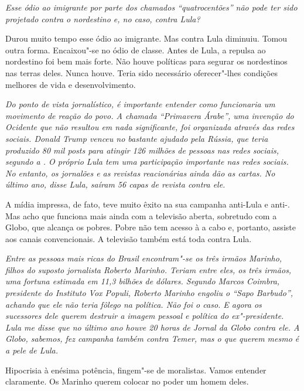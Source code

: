 \itshape
 Esse ódio ao imigrante por parte dos chamados
``quatrocentões'' não pode ter sido projetado contra o nordestino e, no
caso, contra Lula?

\normalfont
Durou muito tempo esse ódio ao imigrante. Mas contra Lula
diminuiu. Tomou outra forma. Encaixou"-se no ódio de classe. Antes de
Lula, a repulsa ao nordestino foi bem mais forte. Não houve políticas
para segurar os nordestinos nas terras deles. Nunca houve. Teria sido
necessário oferecer"-lhes condições melhores de vida e desenvolvimento.

\itshape
 Do ponto de vista jornalístico, é importante entender
como funcionaria um movimento de reação do povo. A chamada ``Primavera
Árabe'', uma invenção do Ocidente que não resultou em nada significante,
foi organizada através das redes sociais. Donald Trump venceu no 
bastante ajudado pela Rússia, que teria produzido 80 mil \emph{posts}
para atingir 126 milhões de pessoas nas redes sociais, segundo a . O
próprio Lula tem uma participação importante nas redes sociais. No
entanto, os jornalões e as revistas reacionárias ainda dão as cartas. No
último ano, disse Lula, saíram 56 capas de revista contra ele.

\normalfont
A mídia impressa, de fato, teve muito êxito na sua
campanha anti-Lula e anti-. Mas acho que funciona mais ainda com a
televisão aberta, sobretudo com a Globo, que alcança os pobres. Pobre
não tem acesso à  a cabo e, portanto, assiste aos canais
convencionais. A televisão também está toda contra Lula.

\itshape
 Entre as pessoas mais ricas do Brasil encontram"-se os
três irmãos Marinho, filhos do suposto jornalista Roberto Marinho.
Teriam entre eles, os três irmãos, uma fortuna estimada em 11,3 bilhões
de dólares. Segundo Marcos Coimbra, presidente do Instituto Vox Populi,
Roberto Marinho engoliu o ``Sapo Barbudo'', achando que ele não teria
fôlego na política. Não foi o caso. E agora os sucessores dele querem
destruir a imagem pessoal e política do ex"-presidente. Lula me disse que
no último ano houve 20 horas de Jornal da Globo contra ele. A Globo,
sabemos, fez campanha também contra Temer, mas o que querem mesmo é a
pele de Lula.

\normalfont
Hipocrisia à enésima potência, fingem"-se de moralistas.
Vamos entender claramente. Os Marinho querem colocar no poder um homem
deles.

